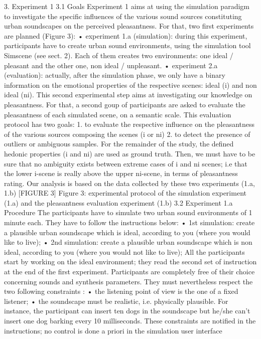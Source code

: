 3. Experiment 1
3.1 Goals
Experiment 1 aims at using the simulation paradigm to investigate the specific influences of the various sound sources constituting urban soundscapes on the perceived pleasantness. For that, two first experiments are planned (Figure 3): • experiment 1.a (simulation): during this experiment, participants have to create urban sound environments, using the simulation tool Simscene (see sect. 2). Each of them creates two environments: one ideal / pleasant and the other one, non ideal / unpleasant. • experiment 2.a (evaluation): actually, after the simulation phase, we only have a binary information on the emotional properties of the respective scenes: ideal (i) and non ideal (ni). This second experimental step aims at investigating our knowledge on pleasantness. For that, a second goup of participants are asked to evaluate the pleasantness of each simulated scene, on a semantic scale. This evaluation protocol has two goals: 1. to evaluate the respective influence on the pleasantness of the various sources composing the scenes (i or ni) 2. to detect the presence of outliers or ambiguous samples. For the remainder of the study, the defined hedonic properties (i and ni) are used as ground truth. Then, we must have to be sure that no ambiguity exists between extreme cases of i and ni scenes; i.e that the lower i-scene is really above the upper ni-scene, in terms of pleasantness rating.
Our analysis is based on the data collected by these two experiments (1.a, 1.b)
[FIGURE 3] Figure 3: experimental protocol of the simulation experiment (1.a) and the pleasantness evaluation experiment (1.b)
3.2 Experiment 1.a
Procedure The participants have to simulate two urban sound environments of 1 minute each. They have to follow the instructions below: • 1st simulation: create a plausible urban soundscape which is ideal, according to you (where you would like to live); • 2nd simulation: create a plausible urban soundscape which is non ideal, according to you (where you would not like to live);
All the participants start by working on the ideal environment; they read the second set of instruction at the end of the first experiment. Participants are completely free of their choice concerning sounds and synthesis parameters. They must nevertheless respect the two following constraints : • the listening point of view is the one of a fixed listener; • the soundscape must be realistic, i.e. physically plausible. For instance, the participant can insert ten dogs in the soundscape but he/she can’t insert one dog barking every 10 milliseconds. These constraints are notified in the instructions; no control is done a priori in the simulation user interface
